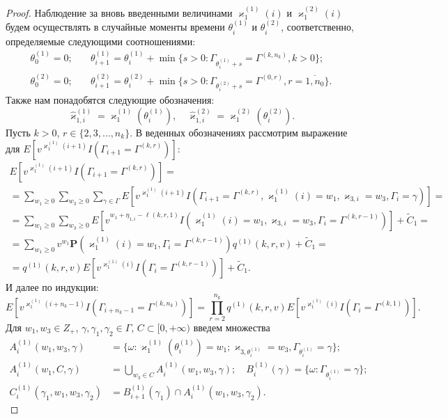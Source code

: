 \documentclass[a4paper,twoside]{article}
\theoremstyle{theorem}
\theoremstyle{remark}
\renewcommand{\Pr}{{\mathbf P}}
\begin{document}
\begin{proof}
Наблюдение за вновь введенными величинами $\varkappa_{1}^{(1)}(i)$ и $\varkappa_{1}^{(2)}(i)$ будем осуществлять в случайные моменты времени $\theta_{i}^{(1)}$ и $\theta_{i}^{(2)}$, соответственно, определяемые следующими соотношениями:
\begin{equation}
\begin{aligned}
  \theta_{0}^{(1)}=0; & \quad \theta_{i+1}^{(1)}=\theta_{i}^{(1)} + \min{\{s>0\colon \Gamma_{\theta_{i}^{(1)}+s} = \Gamma^{(k,n_k)}, k>0\}};\\
  \theta_{0}^{(2)}=0; & \quad  \theta_{i+1}^{(2)}=\theta_{i}^{(2)} + \min{\{s>0\colon \Gamma_{\theta_{i}^{(2)}+s} = \Gamma^{(0,r)}, r=\overline{1,n_0}\}}.
  \label{stop:times}
\end{aligned}
\end{equation}
Также нам понадобятся следующие обозначения:
\begin{equation}
  \hat{\varkappa}_{1,i}^{(1)}=\varkappa_{1}^{(1)}(\theta_{i}^{(1)}), \quad   \hat{\varkappa}_{1,i}^{(2)}=\varkappa_{1}^{(2)}(\theta_{i}^{(2)}).
  \label{stop:queue}
\end{equation}
Пусть $k>0$, $r \in \{2, 3, \ldots, n_k\}$. В веденных обозначениях рассмотрим выражение для $E[v^{\varkappa_{1}^{(1)}(i+1)} I(\Gamma_{i+1}=\Gamma^{(k,r)})]$:
\begin{multline*}
  E[v^{\varkappa_{1}^{(1)}(i+1)} I(\Gamma_{i+1}=\Gamma^{(k,r)})] = \\ =\sum_{w_1 \geqslant 0} \sum_{w_3 \geqslant 0} \sum_{\gamma \in \Gamma} E[v^{\varkappa_{1}^{(1)}(i+1)} I(\Gamma_{i+1}=\Gamma^{(k,r)}, \varkappa_{1}^{(1)}(i)=w_1, \varkappa_{3,i}=w_3,\Gamma_i=\gamma)] =\\= \sum_{w_1\geqslant 0} \sum_{w_3\geqslant 0} E[v^{w_1 + \eta_{1,i}-\ell(k,r,1)} I(\varkappa_{1}^{(1)}(i)=w_1, \varkappa_{3,i}=w_3,\Gamma_i=\Gamma^{(k,r-1)})] + \widetilde{C}_1=\\
  =\sum_{w_1\geqslant 0} v^{w_1 } \Pr (\varkappa_{1}^{(1)}(i)=w_1, \Gamma_i=\Gamma^{(k,r-1)}) q^{(1)}(k,r,v) + \widetilde{C}_1 = \\
  =q^{(1)}(k,r,v) E[v^{\varkappa_{1}^{(1)}(i)} I(\Gamma_i=\Gamma^{(k,r-1)})] + \widetilde{C}_1.
\end{multline*}
И далее по индукции:
\begin{equation*}
  E[v^{\varkappa_{1}^{(1)}(i+n_k-1)} I(\Gamma_{i+n_k-1}=\Gamma^{(k,n_k)})] = \prod_{r=2}^{n_k} q^{(1)}(k,r,v) E[v^{\varkappa_{1}^{(1)}(i)} I(\Gamma_{i}=\Gamma^{(k,1)})].
\end{equation*}
Для $w_1, w_3 \in Z_+$, $\gamma, \gamma_1, \gamma_2 \in \Gamma$, $C \subset [0, +\infty)$ введем множества 
\begin{align*}
  A_i^{(1)}(w_1,w_3,\gamma) &= \{\omega\colon \varkappa_{1}^{(1)}(\theta_{i}^{(1)})=w_1; \varkappa_{3,\theta_{i}^{(1)}}=w_3, \Gamma_{\theta_{i}^{(1)}}=\gamma\};\\
  A_i^{(1)}(w_1,C,\gamma) &= \bigcup_{w_3 \in C} A_i^{(1)}(w_1,w_3,\gamma);\quad B_i^{(1)}(\gamma) =\{\omega\colon \Gamma_{\theta_{i}^{(1)}}=\gamma\};\\
  C_i^{(1)}(\gamma_1,w_1,w_3,\gamma_2)&= B_{i+1}^{(1)}(\gamma_1) \cap A_i^{(1)}(w_1,w_3,\gamma_2) .
\end{align*}


\end{proof}
\end{document}
